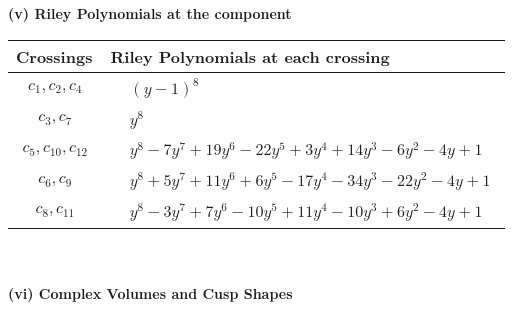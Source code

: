\documentclass[1p]{elsarticle_modified}
\theoremstyle{definition}
\begin{document}
\newpage\renewcommand{\arraystretch}{1}
\flushleft \textbf{(v) Riley Polynomials at the component}\newline \\
\begin{tabular}{m{50pt}|m{274pt}}
Crossings & \hspace{64pt}Riley Polynomials at each crossing \\
\hline $$\begin{aligned}c_{1},c_{2},c_{4}\end{aligned}$$&$\begin{aligned}
&(y-1)^8
\end{aligned}$\\
\hline $$\begin{aligned}c_{3},c_{7}\end{aligned}$$&$\begin{aligned}
&y^8
\end{aligned}$\\
\hline $$\begin{aligned}c_{5},c_{10},c_{12}\end{aligned}$$&$\begin{aligned}
&y^8-7 y^7+19 y^6-22 y^5+3 y^4+14 y^3-6 y^2-4 y+1
\end{aligned}$\\
\hline $$\begin{aligned}c_{6},c_{9}\end{aligned}$$&$\begin{aligned}
&y^8+5 y^7+11 y^6+6 y^5-17 y^4-34 y^3-22 y^2-4 y+1
\end{aligned}$\\
\hline $$\begin{aligned}c_{8},c_{11}\end{aligned}$$&$\begin{aligned}
&y^8-3 y^7+7 y^6-10 y^5+11 y^4-10 y^3+6 y^2-4 y+1
\end{aligned}$\\
\hline
\end{tabular}\\~\\
\newpage\flushleft \textbf{(vi) Complex Volumes and Cusp Shapes}
\end{document}
